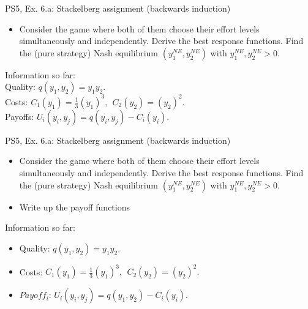 \begin{frame}{PS5, Ex. 6.a: Stackelberg assignment (backwards induction)}
  \begin{itemize}
    \item[(a)] Consider the game where both of them choose their effort levels simultaneously and independently. Derive the best response functions. Find the (pure strategy) Nash equilibrium $(y_1^{NE}, y_2^{NE})$ with $y_1^{NE}, y_2^{NE} > 0$.
  \end{itemize}
    \vfill\null
  \begin{multicols}{2}
    \vfill\null \columnbreak
    Information so far:\\\medskip
    Quality: $q(y_1, y_2) = y_1y_2.$\\
    Costs: $C_1(y_1) = \frac{1}{3}(y_1)^3,\ \ C_2(y_2) = (y_2)^2.$\\
    Payoffs: $U_i(y_i,y_j) = q(y_i,y_j)-C_i(y_i).$
  \end{multicols}
\end{frame}

\begin{frame}{PS5, Ex. 6.a: Stackelberg assignment (backwards induction)}
    \begin{itemize}
    \item[(a)] Consider the game where both of them choose their effort levels simultaneously and independently. Derive the best response functions. Find the (pure strategy) Nash equilibrium $(y_1^{NE}, y_2^{NE})$ with $y_1^{NE}, y_2^{NE} > 0$.
    \end{itemize}
    \vfill\null
  \begin{multicols}{2}
    \begin{itemize}
      \item[(Step 1)] Write up the payoff functions
    \end{itemize}
    \vfill\null \columnbreak
    Information so far:
    \begin{itemize}
    \item[1] Quality: $q(y_1, y_2) = y_1y_2.$\\
    \item[2] Costs: $C_1(y_1) = \frac{1}{3}(y_1)^3,\ \ C_2(y_2) = (y_2)^2.$\\
    \item[3] $Payoff_i$: $U_i(y_i,y_j) = q(y_1,y_2)-C_i(y_i).$ \\
    \end{itemize}
    \vfill\null
  \end{multicols}
\end{frame}


